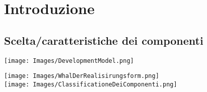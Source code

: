 \section{Introduzione}
    \subsection{Scelta/caratteristiche dei componenti}
        \noindent
        \begin{minipage}[t]{0.48\columnwidth}
            \vspace{0pt} %
            \texttt{[image: Images/DevelopmentModel.png]}
        \end{minipage}%
        \hfill
        \begin{minipage}[t]{0.48\columnwidth}
            \vspace{0pt} %
            \texttt{[image: Images/WhalDerRealisirungsform.png]}\\[1ex]
            \texttt{[image: Images/ClassificationeDeiComponenti.png]}
        \end{minipage}

